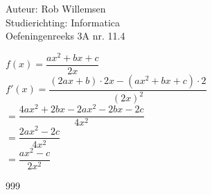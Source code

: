 \documentclass[a4paper]{article}
\begin{document}
\noindent \large Auteur: Rob Willemsen \\
\noindent \large Studierichting: Informatica\\
\noindent \large Oefeningenreeks 3A nr. 11.4\\

\medskip

\normalsize

$f(x) = \dfrac{ax^2 + bx + c}{2x}$ \\

$f'(x) = \dfrac{(2ax + b) \cdot 2x - (ax^2 + bx + c) \cdot 2}{(2x)^2}$ \\

$= \dfrac{4ax^2 + 2bx - 2ax^2 - 2bx - 2c}{4x^2}$ \\

$= \dfrac{2ax^2 - 2c}{4x^2}$ \\

$= \dfrac{ax^2 - c}{2x^2}$ \\

\begin{thebibliography}{999}
\end{thebibliography}
\end{document}
